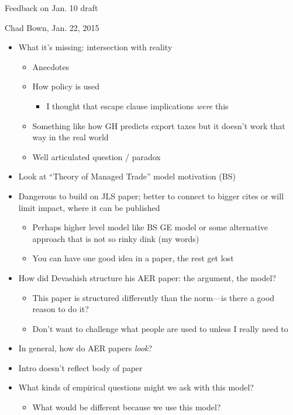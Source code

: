 \documentclass[12pt]{article}
\begin{document}
\newpage
\begin{center}
Feedback on Jan. 10 draft
\end{center}

Chad Bown, Jan. 22, 2015
\begin{itemize}
	\item What it's missing: intersection with reality
		\begin{itemize}
			\item Anecdotes
			\item How policy is used
				\begin{itemize}
					\item I thought that escape clause implications \textit{were} this
				\end{itemize}
			\item Something like how GH predicts export taxes but it doesn't work that way in the real world
			\item Well articulated question / paradox
		\end{itemize}
	\item Look at ``Theory of Managed Trade'' model motivation (BS)
	\item Dangerous to build on JLS paper; better to connect to bigger cites or will limit impact, where it can be published
		\begin{itemize}
			\item Perhaps higher level model like BS GE model or some alternative approach that is not so rinky dink (my words)
			\item You can have one good idea in a paper, the rest get lost
		\end{itemize}
	\item How did Devashish structure his AER paper: the argument, the model?
		\begin{itemize}
			\item This paper is structured differently than the norm---is there a good reason to do it?
			\item Don't want to challenge what people are used to unless I really need to
		\end{itemize}
	\item In general, how do AER papers \textit{look}?
	\item Intro doesn't reflect body of paper
	\item What kinds of empirical questions might we ask with this model?
		\begin{itemize}
			\item What would be different because we use this model?
		\end{itemize}
\end{itemize}
\end{document}
